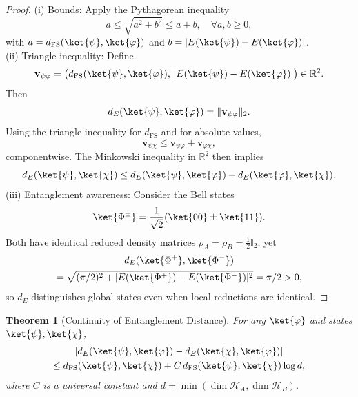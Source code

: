 \documentclass[aps,pra,reprint,nofootinbib,showpacs,superscriptaddress]{revtex4-1}
\newtheorem{theorem}{Theorem}[section]
\newcommand{\Hilbert}{\mathcal{H}}
\begin{document}
\begin{proof}
{(i) Bounds:} Apply the Pythagorean inequality
\[
a \le \sqrt{a^2 + b^2} \le a + b, \quad \forall a,b \ge 0,
\]
with $a = d_{\text{FS}}(\ket{\psi},\ket{\varphi})$ and $b = |E(\ket{\psi}) - E(\ket{\varphi})|$.\\
{(ii) Triangle inequality:}
Define
\[
\mathbf{v}_{\psi\varphi}
=
\big(
d_{\mathrm{FS}}(\ket{\psi},\ket{\varphi}),
\, |E(\ket{\psi}) - E(\ket{\varphi})|
\big)
\in \mathbb{R}^2.
\]
Then
\[
d_E(\ket{\psi},\ket{\varphi})
=
\|\mathbf{v}_{\psi\varphi}\|_2.
\]
Using the triangle inequality for $d_{\mathrm{FS}}$ and for absolute values,
\[
\mathbf{v}_{\psi\chi}
\le
\mathbf{v}_{\psi\varphi}
+
\mathbf{v}_{\varphi\chi},
\]
componentwise. The Minkowski inequality in $\mathbb{R}^2$ then implies
\[
d_E(\ket{\psi},\ket{\chi})
\le
d_E(\ket{\psi},\ket{\varphi})
+
d_E(\ket{\varphi},\ket{\chi}).
\]
{(iii) Entanglement awareness:} Consider the Bell states
\[
\ket{\Phi^\pm} = \frac{1}{\sqrt{2}}(\ket{00} \pm \ket{11}).
\]
Both have identical reduced density matrices $\rho_A = \rho_B = \frac{1}{2} \mathbb{I}_2$, yet
\begin{multline}\notag 
d_E(\ket{\Phi^+},\ket{\Phi^-}) \\= \sqrt{(\pi/2)^2 + |E(\ket{\Phi^+}) - E(\ket{\Phi^-})|^2} = \pi/2 > 0,
\end{multline}
so $d_E$ distinguishes global states even when local reductions are identical.
\end{proof}


\begin{theorem}[Continuity of Entanglement Distance]
\label{thm:entanglement-continuity}
For any $\ket{\varphi}$ and states $\ket{\psi}, \ket{\chi}$,
\begin{multline}\notag 
|d_E(\ket{\psi},\ket{\varphi}) - d_E(\ket{\chi},\ket{\varphi})| \\\le d_{\text{FS}}(\ket{\psi},\ket{\chi}) + C \, d_{\text{FS}}(\ket{\psi},\ket{\chi}) \log d,
\end{multline}
where $C$ is a universal constant and $d = \min(\dim \Hilbert_A, \dim \Hilbert_B)$.
\end{theorem}
\end{document}
